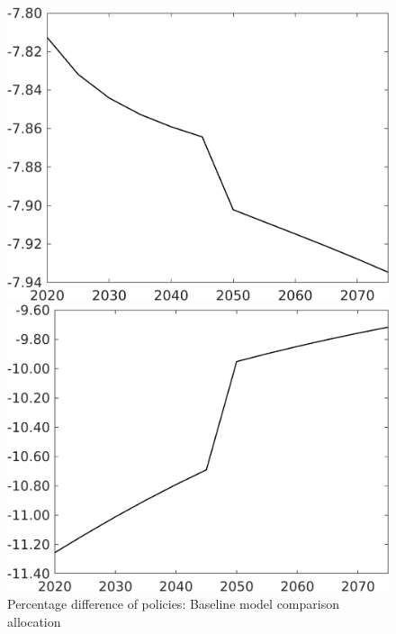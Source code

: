 \documentclass[12pt]{article}
\begin{document}
\begin{figure}[h!!]
	\centering
	\caption{Percentage difference of policies: Baseline model comparison allocation}\label{fig:Pertauf_nsk1_xgr02}
	
	\begin{minipage}[]{0.32\textwidth}
		\includegraphics[width=1\textwidth]{../../codding_model/own_basedOnFried/optimalPol_010922_revision/figures/all_13Sept22/CompTaufPER_bytaul_Reg0_N_spillover0_nsk1_xgr0_knspil0_sep1_LFlimit1_emsbase0_countec0_GovRev0_etaa0.79_lgd0.png}
	\end{minipage}	
	\begin{minipage}[]{0.32\textwidth}
		\includegraphics[width=1\textwidth]{../../codding_model/own_basedOnFried/optimalPol_010922_revision/figures/all_13Sept22/CompTaufPER_bytaul_Reg0_G_spillover0_nsk1_xgr0_knspil0_sep1_LFlimit1_emsbase0_countec0_GovRev0_etaa0.79_lgd0.png}

\end{minipage}
\end{figure}
\end{document}
